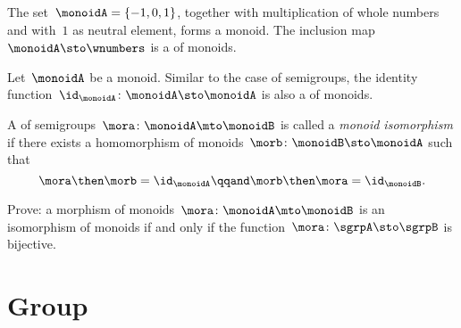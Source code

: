 \begin{example}
  The set~$\monoidA = \{ -1, 0, 1 \}$, together with multiplication of whole numbers and with~$1$ as neutral element, forms a monoid. The inclusion map~$\monoidA \sto \wnumbers$ is a \whomo of monoids.
\end{example}



\begin{definition}
  \label{def:identity-mon-mor}
  Let~$\monoidA$ be a monoid. Similar to the case of semigroups, the identity function~$\id_\monoidA\colon \monoidA \sto \monoidA$ is also a \whomo of monoids.
\end{definition}



\begin{definition}
  \label{def:monoid-iso}
  A \whomo of semigroups~$\mora\colon \monoidA \mto \monoidB$ is called a \emph{monoid isomorphism} if there exists a homomorphism of monoids~$\morb\colon \monoidB \sto \monoidA$ such that
  \begin{equation}
    \mora \then \morb = \id_\monoidA \qqand \morb \then \mora = \id_\monoidB.
  \end{equation}
\end{definition}


\begin{exercise}
  Prove: a morphism of monoids~$\mora\colon \monoidA \mto \monoidB$ is an isomorphism of monoids if and only if the function~$\mora\colon \sgrpA \sto \sgrpB$ is bijective.
\end{exercise}
\begin{solution}
\end{solution}


\section{Group \whomos}






